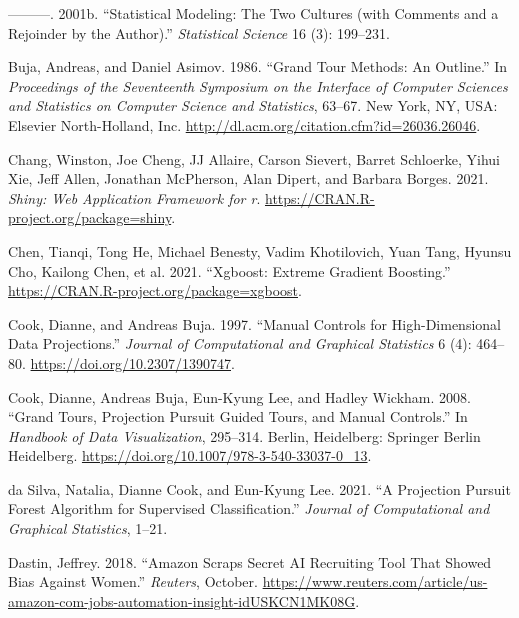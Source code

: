 \documentclass[11pt,twoside]{article}
\newlength{\cslhangindent}
\newlength{\cslentryspacingunit} %
\newenvironment{CSLReferences}[2] %
 {%
  \setlength{\parindent}{0pt}
  \ifodd #1
  \let\oldpar\par
  \def\par{\hangindent=\cslhangindent\oldpar}
  \fi
  \setlength{\parskip}{#2\cslentryspacingunit}
 }%
 {}
\begin{document}
\begin{CSLReferences}{1}{0}
\leavevmode{}%
---------. 2001b. {``Statistical Modeling: {The} Two Cultures (with Comments and a Rejoinder by the Author).''} \emph{Statistical Science} 16 (3): 199--231.

\leavevmode{}%
Buja, Andreas, and Daniel Asimov. 1986. {``Grand {Tour} {Methods}: {An} {Outline}.''} In \emph{Proceedings of the {Seventeenth} {Symposium} on the {Interface} of {Computer} {Sciences} and {Statistics} on {Computer} {Science} and {Statistics}}, 63--67. New York, NY, USA: Elsevier North-Holland, Inc. \url{http://dl.acm.org/citation.cfm?id=26036.26046}.

\leavevmode{}%
Chang, Winston, Joe Cheng, JJ Allaire, Carson Sievert, Barret Schloerke, Yihui Xie, Jeff Allen, Jonathan McPherson, Alan Dipert, and Barbara Borges. 2021. \emph{Shiny: Web Application Framework for r}. \url{https://CRAN.R-project.org/package=shiny}.

\leavevmode{}%
Chen, Tianqi, Tong He, Michael Benesty, Vadim Khotilovich, Yuan Tang, Hyunsu Cho, Kailong Chen, et al. 2021. {``Xgboost: {Extreme} {Gradient} {Boosting}.''} \url{https://CRAN.R-project.org/package=xgboost}.

\leavevmode{}%
Cook, Dianne, and Andreas Buja. 1997. {``Manual {Controls} for {High}-{Dimensional} {Data} {Projections}.''} \emph{Journal of Computational and Graphical Statistics} 6 (4): 464--80. \url{https://doi.org/10.2307/1390747}.

\leavevmode{}%
Cook, Dianne, Andreas Buja, Eun-Kyung Lee, and Hadley Wickham. 2008. {``Grand {Tours}, {Projection} {Pursuit} {Guided} {Tours}, and {Manual} {Controls}.''} In \emph{Handbook of {Data} {Visualization}}, 295--314. Berlin, Heidelberg: Springer Berlin Heidelberg. \url{https://doi.org/10.1007/978-3-540-33037-0_13}.

\leavevmode{}%
da Silva, Natalia, Dianne Cook, and Eun-Kyung Lee. 2021. {``A {Projection} {Pursuit} {Forest} {Algorithm} for {Supervised} {Classification}.''} \emph{Journal of Computational and Graphical Statistics}, 1--21.

\leavevmode{}%
Dastin, Jeffrey. 2018. {``Amazon Scraps Secret {AI} Recruiting Tool That Showed Bias Against Women.''} \emph{Reuters}, October. \url{https://www.reuters.com/article/us-amazon-com-jobs-automation-insight-idUSKCN1MK08G}.


\end{CSLReferences}
\end{document}
